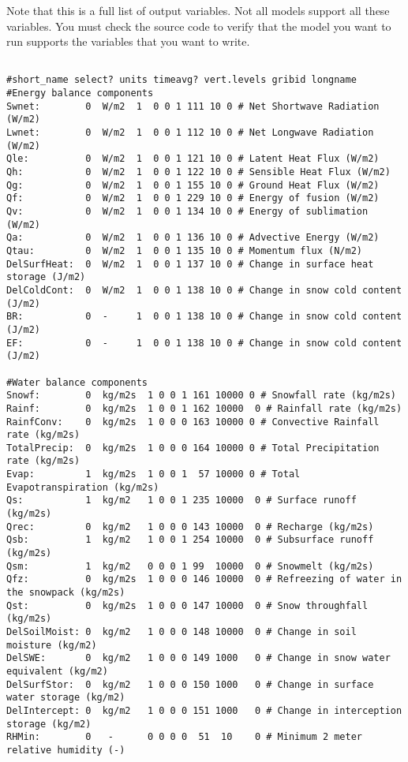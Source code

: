  Note that this is a full list of output variables.  Not all models
 support all these variables.  You must check the source code to
 verify that the model you want to run supports the variables that
 you want to write.  
 \begin{verbatim}

#short_name select? units timeavg? vert.levels gribid longname
#Energy balance components
Swnet:        0  W/m2  1  0 0 1 111 10 0 # Net Shortwave Radiation (W/m2)
Lwnet:        0  W/m2  1  0 0 1 112 10 0 # Net Longwave Radiation (W/m2)
Qle:          0  W/m2  1  0 0 1 121 10 0 # Latent Heat Flux (W/m2)
Qh:           0  W/m2  1  0 0 1 122 10 0 # Sensible Heat Flux (W/m2)
Qg:           0  W/m2  1  0 0 1 155 10 0 # Ground Heat Flux (W/m2)
Qf:           0  W/m2  1  0 0 1 229 10 0 # Energy of fusion (W/m2)
Qv:           0  W/m2  1  0 0 1 134 10 0 # Energy of sublimation (W/m2)
Qa:           0  W/m2  1  0 0 1 136 10 0 # Advective Energy (W/m2)
Qtau:         0  W/m2  1  0 0 1 135 10 0 # Momentum flux (N/m2)
DelSurfHeat:  0  W/m2  1  0 0 1 137 10 0 # Change in surface heat storage (J/m2)
DelColdCont:  0  W/m2  1  0 0 1 138 10 0 # Change in snow cold content (J/m2)
BR:           0  -     1  0 0 1 138 10 0 # Change in snow cold content (J/m2)
EF:           0  -     1  0 0 1 138 10 0 # Change in snow cold content (J/m2)

#Water balance components
Snowf:        0  kg/m2s  1 0 0 1 161 10000 0 # Snowfall rate (kg/m2s)
Rainf:        0  kg/m2s  1 0 0 1 162 10000  0 # Rainfall rate (kg/m2s)
RainfConv:    0  kg/m2s  1 0 0 0 163 10000 0 # Convective Rainfall rate (kg/m2s)
TotalPrecip:  0  kg/m2s  1 0 0 0 164 10000 0 # Total Precipitation rate (kg/m2s)
Evap:         1  kg/m2s  1 0 0 1  57 10000 0 # Total Evapotranspiration (kg/m2s)
Qs:           1  kg/m2   1 0 0 1 235 10000  0 # Surface runoff (kg/m2s)
Qrec:         0  kg/m2   1 0 0 0 143 10000  0 # Recharge (kg/m2s)
Qsb:          1  kg/m2   1 0 0 1 254 10000  0 # Subsurface runoff (kg/m2s)
Qsm:          1  kg/m2   0 0 0 1 99  10000  0 # Snowmelt (kg/m2s)
Qfz:          0  kg/m2s  1 0 0 0 146 10000  0 # Refreezing of water in the snowpack (kg/m2s)
Qst:          0  kg/m2s  1 0 0 0 147 10000  0 # Snow throughfall (kg/m2s)
DelSoilMoist: 0  kg/m2   1 0 0 0 148 10000  0 # Change in soil moisture (kg/m2)
DelSWE:       0  kg/m2   1 0 0 0 149 1000   0 # Change in snow water equivalent (kg/m2)
DelSurfStor:  0  kg/m2   1 0 0 0 150 1000   0 # Change in surface water storage (kg/m2)
DelIntercept: 0  kg/m2   1 0 0 0 151 1000   0 # Change in interception storage (kg/m2)
RHMin:        0   -      0 0 0 0  51  10    0 # Minimum 2 meter relative humidity (-)


\end{verbatim}
